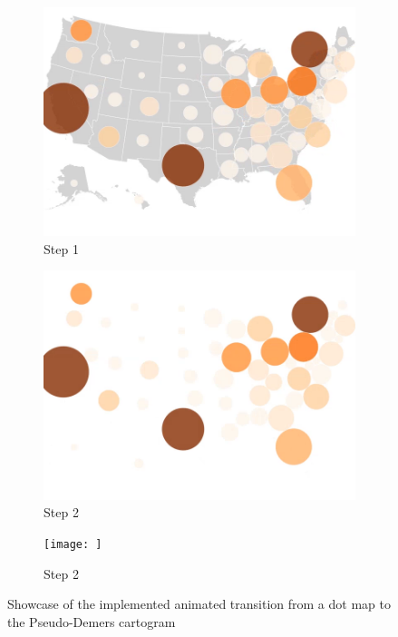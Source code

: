 \begin{figure}
    \begin{subfigure}[b]{0.31\textwidth}
        \centering
        \includegraphics[width=\textwidth]{images/results/dot_cartogram/transition_10.png}
        \caption[]%
        {{\small Step 1}}
    \end{subfigure}
    \hfill
    \begin{subfigure}[b]{0.31\textwidth}
        \centering
        \includegraphics[width=\textwidth]{images/results/dot_cartogram/transition_11.png}
        \caption[]%
        {{\small Step 2}}
    \end{subfigure}
    \hfill
    \begin{subfigure}[b]{0.31\textwidth}
        \centering
        \texttt{[image: ]}
        \caption[]%
        {{\small Step 2}}
    \end{subfigure}



    \caption[Showcase of the implemented animated transition from a dot map to the Pseudo-Demers cartogram]
    {\small Showcase of the implemented animated transition from a dot map to the Pseudo-Demers cartogram}
    \label{f:showcase-transition-dot-cartogram}
\end{figure}

